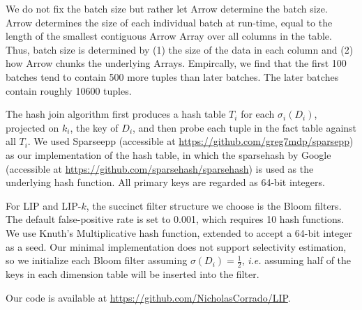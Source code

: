 We do not fix the batch size but rather let Arrow determine the batch size.
Arrow determines the size of each individual batch at run-time, 
equal to the length of the smallest contiguous Arrow Array over all columns in the table.
Thus, batch size is determined by 
(1) the size of the data in each column and
(2) how Arrow chunks the underlying Arrays.
Empircally, we find that the first 100 batches tend to contain 500 more tuples than later batches.
The later batches contain roughly 10600 tuples.

The hash join algorithm first produces a hash table $T_i$ for each $\sigma_i(D_i)$, projected on $k_i$, the key of $D_i$, and then probe each tuple in the fact table against all $T_i$. We used Sparseepp (accessible at \url{https://github.com/greg7mdp/sparsepp}) as our implementation of the hash table, in which the sparsehash by Google (accessible at \url{https://github.com/sparsehash/sparsehash}) is used as the underlying hash function. All primary keys are regarded as 64-bit integers.

For LIP and LIP-$k$, the succinct filter structure we choose is the Bloom filters. 
The default false-positive rate is set to 0.001, which requires 10 hash functions.
We use Knuth's Multiplicative hash function, extended to accept a 64-bit integer as a seed. 
Our minimal implementation does not support selectivity estimation, 
so we initialize each Bloom filter assuming $\sigma(D_i) = \frac{1}{2}$, 
{\it i.e.} assuming half of the keys in each dimension table will be inserted into the filter.

Our code is available at \url{https://github.com/NicholasCorrado/LIP}.


